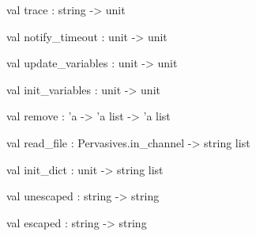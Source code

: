 \documentclass[11pt]{article}
\begin{document}
\label{val:Server.trace}\begin{ocamldoccode}
val trace : string -> unit
\end{ocamldoccode}




\label{val:Server.notify-underscoretimeout}\begin{ocamldoccode}
val notify_timeout : unit -> unit
\end{ocamldoccode}




\label{val:Server.update-underscorevariables}\begin{ocamldoccode}
val update_variables : unit -> unit
\end{ocamldoccode}




\label{val:Server.init-underscorevariables}\begin{ocamldoccode}
val init_variables : unit -> unit
\end{ocamldoccode}




\label{val:Server.remove}\begin{ocamldoccode}
val remove : 'a -> 'a list -> 'a list
\end{ocamldoccode}




\label{val:Server.read-underscorefile}\begin{ocamldoccode}
val read_file : Pervasives.in_channel -> string list
\end{ocamldoccode}




\label{val:Server.init-underscoredict}\begin{ocamldoccode}
val init_dict : unit -> string list
\end{ocamldoccode}




\label{val:Server.unescaped}\begin{ocamldoccode}
val unescaped : string -> string
\end{ocamldoccode}




\label{val:Server.escaped}\begin{ocamldoccode}
val escaped : string -> string
\end{ocamldoccode}
\end{document}
